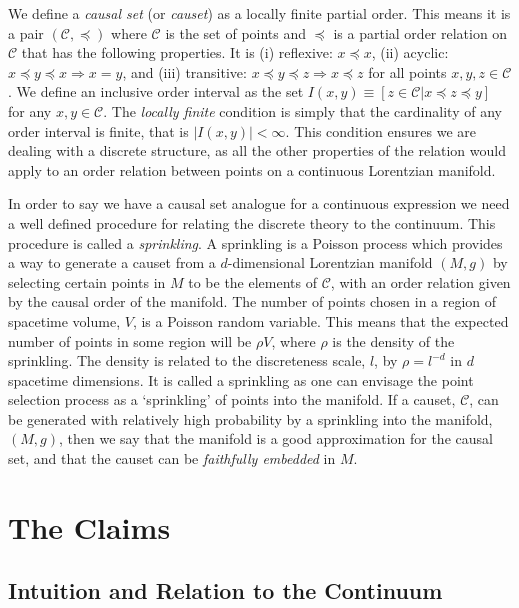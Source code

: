 \documentclass[12pt]{article}
\newcommand{\mb}[1]{\marginnote{\texttt{\small MB:\,#1}}}
\begin{document}
We define a \textit{causal set} (or \textit{causet}) as a locally finite partial order. This means it is a pair $ (\mathcal{C},\preceq)$ where $\mathcal{C}$ is the set of points and $\preceq$ is a partial order relation on $\mathcal{C}$ that has the following properties. It is (i) reflexive: $x\preceq x$, (ii) acyclic: $x\preceq y\preceq x \Rightarrow x=y$, and (iii) transitive: $x\preceq y\preceq z \Rightarrow x\preceq z$ for all points $x, y, z \in \mathcal{C}$. We define an inclusive order interval as the set $I (x,y)\equiv [ z\in\mathcal{C}|x\preceq z\preceq y]$ for any $x, y\in\mathcal{C}$. The \textit{locally finite} condition is simply that the cardinality of any order interval is finite, that is $|I (x,y)|<\infty$. This condition ensures we are dealing with a discrete structure, as all the other properties of the relation would apply to an order relation between points on a continuous Lorentzian manifold.

In order to say we have a causal set analogue for a continuous expression we need a well defined procedure for relating the discrete theory to the continuum. This procedure is called a \textit{sprinkling}. A sprinkling is a Poisson process which provides a way to generate a causet from a $d$-dimensional Lorentzian manifold $ (M,g)$ by selecting certain points in $M$ to be the elements of $\mathcal{C}$, with an order relation given by the causal order of the manifold.\mb{certain points?} The number of points chosen in a region of spacetime volume, $V$, is a Poisson random variable. This means that the expected number of points in some region will be $\rho V$, where $\rho$ is the density of the sprinkling. The density is related to the discreteness scale, $l$, by $\rho=l^{-d}$ in $d$ spacetime dimensions. It is called a sprinkling as one can envisage the point selection process as a `sprinkling' of points into the manifold. If a causet, $\mathcal{C}$, can be generated with relatively high probability by a sprinkling into the manifold, $ (M,g)$, then we say that the manifold is a good approximation for the causal set, and that the causet can be \emph{faithfully embedded} in $M$.

\section{The Claims}

\subsection{Intuition and Relation to the Continuum}
\end{document}

